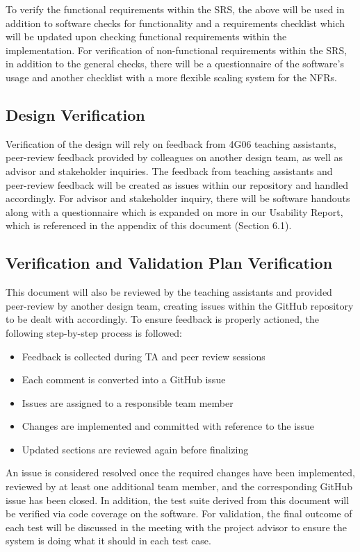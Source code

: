 \documentclass[12pt, titlepage]{article}
\begin{document}
To verify the functional requirements within the SRS, the above will be used in addition to software checks for functionality and a requirements checklist which will be updated upon checking functional requirements within the implementation.
For verification of non-functional requirements within the SRS, in addition to the general checks, there will be a questionnaire of the software’s usage and another checklist with a more flexible scaling system for the NFRs.

\subsection{Design Verification}

Verification of the design will rely on feedback from 4G06 teaching assistants, peer-review feedback provided by colleagues on another design team, as well as advisor and stakeholder inquiries. The feedback from teaching assistants and peer-review feedback will be created as issues within our repository and handled accordingly. For advisor and stakeholder inquiry, there will be software handouts along with a questionnaire which is expanded on more in our Usability Report, which is referenced in the appendix of this document (Section 6.1).

\subsection{Verification and Validation Plan Verification}

This document will also be reviewed by the teaching assistants and provided peer-review by another design team, creating issues within the GitHub repository to be dealt with accordingly. To ensure feedback is properly actioned, the following step-by-step process is followed:
\begin{itemize}
    \item Feedback is collected during TA and peer review sessions
    \item Each comment is converted into a GitHub issue
    \item Issues are assigned to a responsible team member
    \item Changes are implemented and committed with reference to the issue
    \item Updated sections are reviewed again before finalizing
\end{itemize}
An issue is considered resolved once the required changes have been implemented, reviewed by at least one additional team member, and the corresponding GitHub issue has been closed. In addition, the test suite derived from this document will be verified via code coverage on the software. For validation, the final outcome of each test will be discussed in the meeting with the project advisor to ensure the system is doing what it should in each test case.
\end{document}
